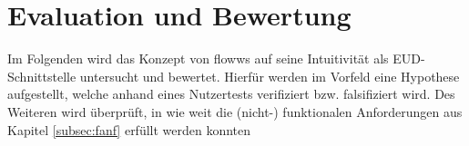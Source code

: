 \chapter{Evaluation und Bewertung}
Im Folgenden wird das Konzept von flowws auf seine Intuitivität als \ac{EUD}-Schnittstelle untersucht und bewertet. Hierfür werden im Vorfeld eine Hypothese aufgestellt, welche anhand eines Nutzertests verifiziert bzw. falsifiziert wird. Des Weiteren wird überprüft, in wie weit die (nicht-) funktionalen Anforderungen aus Kapitel \ref{subsec:fanf} erfüllt werden konnten








